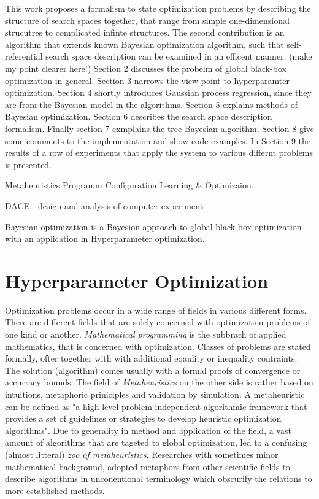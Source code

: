 \documentclass[english]{article}
\begin{document}
This work proposes a formalism to state optimization problems by describing the structure of search spaces together, that range from simple one-dimensional strucutres to complicated infinte structures. The second contribution is an algorithm that extends known Bayesian optimization algorithm, such that self-referential search space description can be examined in an efficent manner.
(make my point clearer here!)
Section 2 discusses the probelm of global black-box optimization in general. Section 3 narrows the view point to hyperparamter optimization.
Section 4 shortly introduces Gaussian process regression, since they are from the Bayesian model in the algorithms.
Section 5 explains methods of Bayesian optimization.
Section 6 describes the search space description formalism.
Finally section 7 exmplains the tree Bayesian algorithm.
Section 8 give some comments to the implementation and show code examples.
In Section 9 the results of a row of experiments that apply the system to various differnt problems is presented.

Metaheuristics
Programm Configuration
Learning \& Optimizaion.

DACE - design and analysis of computer experiment


Bayesian optimization is a Bayesion approach to global black-box optimization with an application in Hyperparameter optimization.

\section{Hyperparameter Optimization}
Optimization problems occur in a wide range of fields in various different forms. There are different fields that are solely concerned with optimization problems of one kind or another. \textit{Mathematical programming} is the subbrach of applied mathematics, that is concerned with optimization. Classes of problems are stated formally, ofter together with with additional eqaulity or inequality contraints. The solution (algorithm) comes usually with a formal proofs of convergence or accurracy bounds. The field of \textit{Metaheuristics}
on the other side is rather based on intuitions, metaphoric priniciples and validation by simulation. A metaheuristic can be defined as "a high-level problem-independent algorithmic framework that provides a set of guidelines or strategies to develop heuristic optimization algorithms". \cite{sorensen_history_2014} Due to generality in method and application of the field, a vast amount of algorithms that are tageted to global optimization, led to a confusing (almost litteral) \textit{zoo of metaheuristics}. Researches with sometimes minor mathematical background, adopted metaphors from other scientific fields to describe algorithms in unconentional terminology which obscurify the relations to more established methods. \cite{sorensen_metaheuristics-metaphor_2015}
\end{document}
